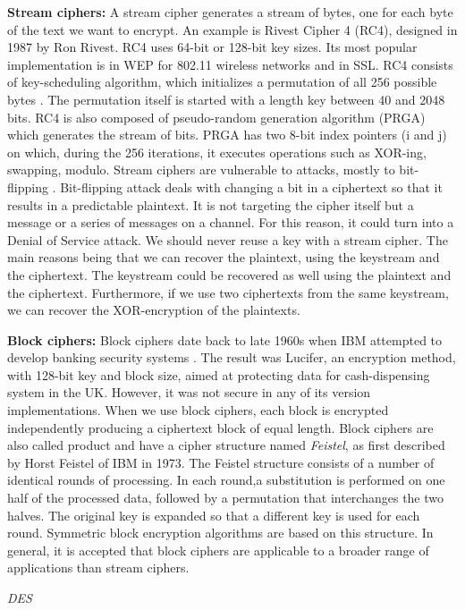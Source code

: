 \textbf{Stream ciphers:} A stream cipher generates a stream of bytes, one for each byte of the text we want to encrypt.  An example is Rivest Cipher 4 (RC4), designed in 1987 by Ron Rivest. RC4 uses 64-bit or 128-bit key sizes. Its most popular implementation is in WEP for 802.11 wireless networks and in SSL. RC4 consists of key-scheduling algorithm, which initializes a permutation of all 256 possible bytes \cite{stallings2017}. The permutation itself is started with a length key between 40 and 2048 bits. RC4 is also composed of pseudo-random generation algorithm (PRGA) which generates the stream of bits. PRGA has two 8-bit index pointers (i and j) on which, during the 256 iterations, it executes operations such as XOR-ing, swapping, modulo. Stream ciphers are vulnerable to attacks, mostly to bit-flipping \cite{wikirc4} . Bit-flipping attack deals with changing a bit in a ciphertext so that it results in a predictable plaintext. It is not targeting the cipher itself but a message or a series of messages on a channel. For this reason, it could turn into a Denial of Service attack. We should never reuse a key with a stream cipher. The main reasons being that we can recover the plaintext, using the keystream and the ciphertext. The keystream could be recovered as well using the plaintext and the ciphertext. Furthermore, if we use two ciphertexts from the same keystream, we can recover the XOR-encryption of the plaintexts.

\textbf{Block ciphers:} Block ciphers date back to late 1960s when IBM attempted to develop banking security systems \cite{ibmcrypto}. The result was Lucifer, an encryption method, with 128-bit key and block size, aimed at protecting data for cash-dispensing system in the UK. However, it was not secure in any of its version implementations. 
When we use block ciphers, each block is encrypted independently producing a ciphertext block of equal length. Block ciphers are also called product and have a cipher structure named \emph{Feistel}, as first described by Horst Feistel of IBM in 1973. The Feistel structure consists of a number of identical rounds of processing. In each round,a substitution is performed on one half of the processed data, followed by a permutation that interchanges the two halves. The original key is expanded so that a different key is used for each round. Symmetric block encryption algorithms are based on this structure. 
In general, it is accepted that block ciphers are applicable to a broader range of applications than stream ciphers. 


\textit{DES}

